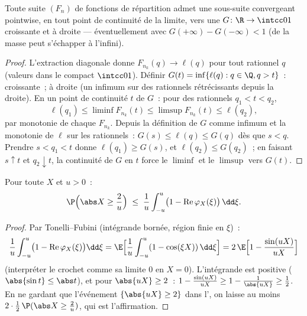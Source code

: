\begin{theorem}
\label{thm:b3:clt:helly}
Toute suite $(F_n)$ de fonctions de répartition admet une
sous-suite convergeant pointwise, en tout point de continuité
de la limite, vers une $G \colon \R \to \intcc01$ croissante
et  à droite --- éventuellement avec $G(+\infty) -
G(-\infty) < 1$ (de la masse peut s'échapper à
l'infini).
\end{theorem}

\begin{proof}
L'extraction diagonale donne $F_{n_k}(q) \to \ell(q)$ pour
tout rationnel $q$ (valeurs dans le compact $\intcc01$).
Définir $G(t) = \inf\{\ell(q) : q \in \Q, q > t\}$~:
croissante~;  à droite (un infimum sur des 
rationnels rétrécissants depuis la droite). En un point de
continuité $t$ de $G$~: pour des rationnels $q_1 < t < q_2$,
\[
\ell(q_1) \leq \liminf F_{n_k}(t) \leq \limsup F_{n_k}(t)
\leq \ell(q_2),
\]
par monotonie de chaque $F_{n_k}$. Depuis la définition de
$G$ comme infimum et la monotonie de $\ell$ sur les
rationnels~: $G(s) \leq \ell(q) \leq G(q)$ dès que $s < q$.
Prendre $s < q_1 < t$ donne $\ell(q_1) \geq G(s)$, et
$\ell(q_2) \leq G(q_2)$~; en faisant $s \uparrow t$ et $q_2
\downarrow t$, la continuité de $G$ en $t$ force le
$\liminf$ et le $\limsup$ vers $G(t)$.
\end{proof}

\begin{lemma}
\label{lem:b3:clt:tightness}
Pour toute  $X$ et $u > 0$~:
\[
\P\Bigl(\abs X \geq \frac2u\Bigr) \;\leq\;
\frac1u\int_{-u}^{u}\bigl(1 -
\operatorname{Re}\varphi_X(\xi)\bigr)\,\dd\xi .
\]
\end{lemma}

\begin{proof}
Par Tonelli--Fubini (intégrande bornée, région finie en
$\xi$)~:
\[
\frac1u\int_{-u}^u\bigl(1 -
\operatorname{Re}\varphi_X(\xi)\bigr)\dd\xi
= \E\Bigl[\frac1u\int_{-u}^u(1 - \cos(\xi X))\,\dd\xi\Bigr]
= 2\,\E\Bigl[1 - \frac{\sin(uX)}{uX}\Bigr]
\]
(interpréter le crochet comme sa limite $0$ en $X = 0$).
L'intégrande est positive ($\abs{\sin t} \leq \abs t$), et
pour $\abs{uX} \geq 2$~: $1 - \frac{\sin(uX)}{uX} \geq 1 -
\frac1{\abs{uX}} \geq \frac12$. En ne gardant que
l'événement $\{\abs{uX} \geq 2\}$ dans l', on laisse
au moins $2 \cdot \frac12\,\P(\abs X \geq \frac2u)$, qui
est l'affirmation.
\end{proof}

